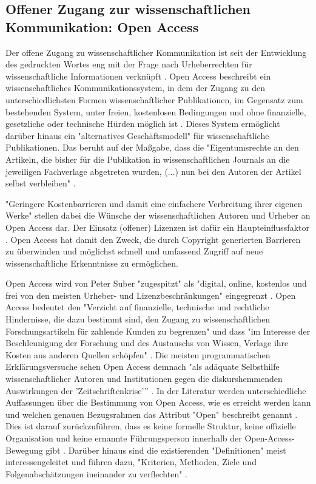 \subsection{Offener Zugang zur wissenschaftlichen Kommunikation: Open Access}

Der offene Zugang zu wissenschaftlicher Kommunikation ist seit der Entwicklung des gedruckten Wortes eng mit der Frage nach Urheberrechten für wissenschaftliche Informationen verknüpft \cite{Case_2000}. Open Access beschreibt ein wissenschaftliches Kommunikationssystem, in dem der Zugang zu den unterschiedlichsten Formen wissenschaftlicher Publikationen, im Gegensatz zum bestehenden System, unter freien, kostenlosen Bedingungen und ohne finanzielle, gesetzliche oder technische Hürden möglich ist \cite{WD_bundestag_2009}. Dieses System ermöglicht darüber hinaus ein "alternatives Geschäftsmodell"\cite{lewis_2012_inevitability} für wissenschaftliche Publikationen. Das beruht auf der Maßgabe, dass die "Eigentumsrechte an den Artikeln, die bisher für die Publikation in wissenschaftlichen Journals an die jeweiligen Fachverlage abgetreten wurden, (...) nun bei den Autoren der Artikel selbst verbleiben" \cite{Hess_2006}.

"Geringere Kostenbarrieren und damit eine einfachere Verbreitung ihrer eigenen Werke" \cite{WD_bundestag_2009} stellen dabei die Wünsche der wissenschaftlichen Autoren und Urheber an Open Access dar. Der Einsatz (offener) Lizenzen ist dafür ein Haupteinflussfaktor \cite{cite:16}. Open Access hat damit den Zweck, die durch Copyright generierten Barrieren zu überwinden und möglichst schnell und umfassend Zugriff auf neue wissenschaftliche Erkenntnisse zu ermöglichen.

Open Access wird von Peter Suber "zugespitzt" \cite{naeder_2010_open} als "digital, online, kostenlos und frei von den meisten Urheber- und Lizenzbeschränkungen" \cite{suber_2012_open} eingegrenzt \cite{Adema_2014_open_access}. Open Access bedeutet den "Verzicht auf finanzielle, technische und rechtliche Hindernisse, die dazu bestimmt sind, den Zugang zu wissenschaftlichen Forschungsartikeln für zahlende Kunden zu begrenzen" und dass "im Interesse der Beschleunigung der Forschung und des Austauschs von Wissen, Verlage ihre Kosten aus anderen Quellen schöpfen" \cite{Suber_2002}. Die meisten programmatischen Erklärungsversuche sehen Open Access demnach "als adäquate Selbsthilfe wissenschaftlicher Autoren und Institutionen gegen die diskurshemmenden Auswirkungen der 'Zeitschriftenkrise'” \cite{naeder_2010_open}. In der Literatur werden unterschiedliche Auffassungen über die Bestimmung von Open Access, wie es erreicht werden kann und welchen genauen Bezugsrahmen das Attribut "Open" beschreibt genannt \cite{Adema_2014_open_access} \cite{cite:17}. Dies ist darauf zurückzuführen, dass es keine formelle Struktur, keine offizielle Organisation und keine ernannte Führungsperson innerhalb der Open-Access-Bewegung gibt \cite{poynder_2011_suber}. Darüber hinaus sind die existierenden "Definitionen" meist interessengeleitet und führen dazu, "Kriterien, Methoden, Ziele und Folgenabschätzungen ineinander zu verflechten" \cite{naeder_2010_open}.

